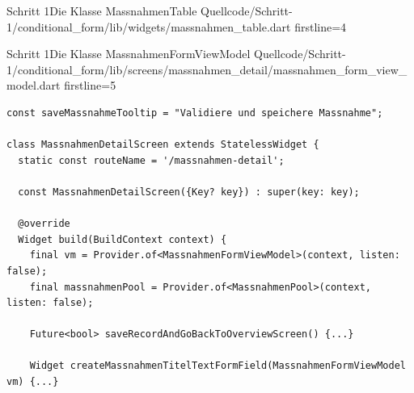 {\begin{alexlisting}{Schritt 1}{Die Klasse MassnahmenTable}
  {Quellcode/Schritt-1/conditional_form/lib/widgets/massnahmen_table.dart}
  {firstline=4}
  \label{lst:Schritt1KlasseMassnahmenTable}
\end{alexlisting}





\begin{alexlisting}{Schritt 1}{Die Klasse MassnahmenFormViewModel}
  {Quellcode/Schritt-1/conditional_form/lib/screens/massnahmen_detail/massnahmen_form_view_model.dart}
  {firstline=5}
  \label{lst:Schritt1KlasseMassnahmenFormViewModel}
\end{alexlisting}







\begin{listing}[htbp]
  \begin{verbatim}
const saveMassnahmeTooltip = "Validiere und speichere Massnahme";

class MassnahmenDetailScreen extends StatelessWidget {
  static const routeName = '/massnahmen-detail';

  const MassnahmenDetailScreen({Key? key}) : super(key: key);

  @override
  Widget build(BuildContext context) {
    final vm = Provider.of<MassnahmenFormViewModel>(context, listen: false);
    final massnahmenPool = Provider.of<MassnahmenPool>(context, listen: false);

    Future<bool> saveRecordAndGoBackToOverviewScreen() {...}

    Widget createMassnahmenTitelTextFormField(MassnahmenFormViewModel vm) {...}


\end{verbatim}
\end{listing}}
